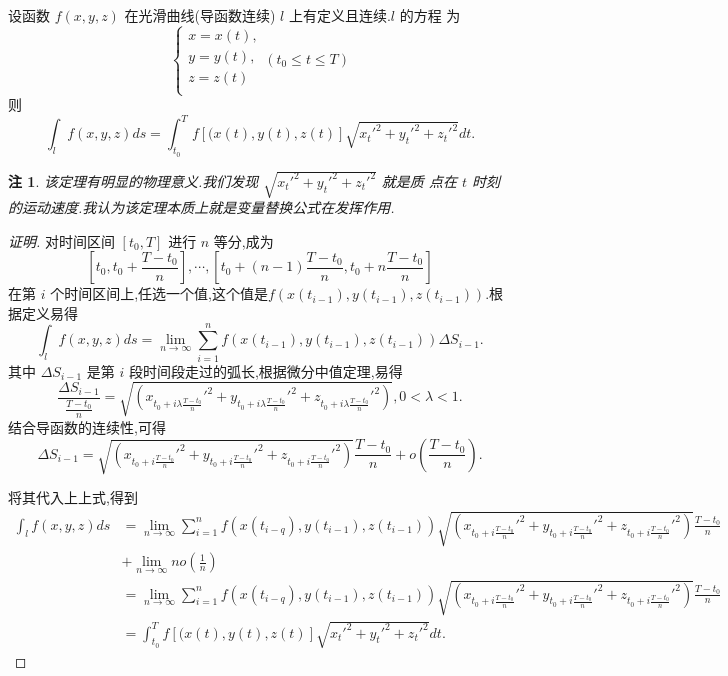 \documentclass[a4paper, 12pt]{article} %
\newtheorem*{ddtheorem}{注}
\newenvironment{remark}
{\bigskip\begin{mdframed}[backgroundcolor=gray!40,rightline=false,leftline=false,topline=false,bottomline=false]\begin{ddtheorem}}
    {\end{ddtheorem}\end{mdframed}\bigskip}
\begin{document}
设函数 $f(x,y,z)$ 在光滑曲线(导函数连续) $l$ 上有定义且连续.$l$ 的方程
为
$$
\begin{cases}
  x=x(t),\\
  y=y(t),\\
  z=z(t)\\
\end{cases}(t_0\leq t\leq T)
$$
则
$$
\int_lf(x,y,z)ds=\int_{t_0}^Tf[(x(t),y(t),z(t)]\sqrt{x_t'^2+y_t'^2+z_t'^2}dt.
$$
\begin{remark}
  该定理有明显的物理意义.我们发现 $\sqrt{x_t'^2+y_t'^2+z_t'^2}$ 就是质
  点在 $t$ 时刻的运动速度.我认为该定理本质上就是变量替换公式在发挥作用.
\end{remark}
\begin{proof}[证明]
对时间区间 $[t_0,T]$ 进行 $n$ 等分,成为
$$[t_0,t_0+\frac{T-t_0}{n}],\cdots,[t_0+(n-1)\frac{T-t_0}{n},t_0+n
\frac{T-t_0}{n}]$$
在第 $i$ 个时间区间上,任选一个值,这个值是$f(x(t_{i-1}),y(t_{i-1}),z(t_{i-1}))$.根据定义易得
$$
\int_lf(x,y,z)ds=\lim_{n\to\infty}\sum_{i=1}^nf(x(t_{i-1}),y(t_{i-1}),z(t_{i-1}))\Delta S_{i-1}.
$$
其中 $\Delta S_{i-1}$ 是第 $i$ 段时间段走过的弧长,根据微分中值定理,易得
$$
\frac{\Delta S_{i-1}}{\frac{T-t_0}{n}}=\sqrt{(x_{t_0+i\lambda\frac{T-t_0}{n}}'^2+y_{t_0+i\lambda\frac{T-t_0}{n}}'^2+z_{t_0+i\lambda\frac{T-t_0}{n}}'^2)},0<\lambda<1.
$$
结合导函数的连续性,可得
$$
\Delta S_{i-1}=\sqrt{(x_{t_0+i\frac{T-t_0}{n}}'^2+y_{t_0+i\frac{T-t_0}{n}}'^2+z_{t_0+i\frac{T-t_0}{n}}'^2)}\frac{T-t_0}{n}+o(\frac{T-t_0}{n}).
$$

将其代入上上式,得到
\begin{align*}
\int_lf(x,y,z)ds&=\lim_{n\to\infty}\sum_{i=1}^nf(x(t_{i-q}),y(t_{i-1}),z(t_{i-1}))\sqrt{(x_{t_0+i\frac{T-t_0}{n}}'^2+y_{t_0+i\frac{T-t_0}{n}}'^2+z_{t_0+i\frac{T-t_0}{n}}'^2)}\frac{T-t_0}{n}\\&+\lim_{n\to\infty}no(\frac{1}{n})\\&=\lim_{n\to\infty}\sum_{i=1}^nf(x(t_{i-q}),y(t_{i-1}),z(t_{i-1}))\sqrt{(x_{t_0+i\frac{T-t_0}{n}}'^2+y_{t_0+i\frac{T-t_0}{n}}'^2+z_{t_0+i\frac{T-t_0}{n}}'^2)}\frac{T-t_0}{n}\\&=\int_{t_0}^Tf[(x(t),y(t),z(t)]\sqrt{x_t'^2+y_t'^2+z_t'^2}dt.
\end{align*}
\end{proof}
  

  

  
\end{document}
